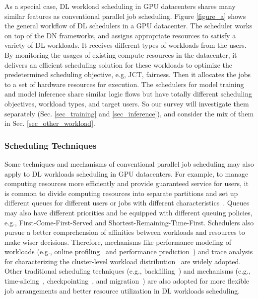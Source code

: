 As a special case, DL workload scheduling in GPU datacenters shares many similar features as conventional parallel job scheduling. Figure \ref{figure_a} shows the general workflow of DL schedulers in a GPU datacenter. The scheduler works on top of the DN frameworks, and assigns appropriate resources to satisfy a variety of DL workloads. It receives different types of workloads from the users. By monitoring the usages of existing compute resources in the datacenter, it delivers an efficient scheduling solution for these workloads to optimize the predetermined scheduling objective, e.g, JCT, fairness. Then it allocates the jobs to a set of hardware resources for execution. The schedulers for model training and model inference share similar logic flows but have totally different scheduling objectives, workload types, and target users. So our survey will investigate them separately (Sec. \ref{sec_training} and \ref{sec_inference}), and consider the mix of them in Sec. \ref{sec_other_workload}.




\subsubsection{Scheduling Techniques}


Some techniques and mechanisms of conventional parallel job scheduling may also apply to DL workloads scheduling in GPU datacenters. For example, to manage computing resources more efficiently and provide guaranteed service for users, it is common to divide computing resources into separate partitions and set up different queues for different users or jobs with different characteristics~\cite{feitelson1997theory, Tiresias, ASTRAEA}. Queues may also have different priorities and be equipped with different queuing policies, e.g., First-Come-First-Served and Shortest-Remaining-Time-First. Schedulers also pursue a better comprehension of affinities between workloads and resources to make wiser decisions. Therefore, mechanisms like performance modeling of workloads (e.g., online profiling~\cite{Chronus} and performance prediction~\cite{Tiresias}) and trace analysis for characterizing the cluster-level workload distribution~\cite{Helios, MLaaS} are widely adopted. Other traditional scheduling techniques (e.g., backfilling~\cite{mu2001backfilling, Tiresias}) and mechanisms (e.g., time-slicing~\cite{Gandiva}, checkpointing~\cite{ASTRAEA}, and migration~\cite{Gandiva, Gandivafair}) are also adopted for more flexible job arrangements and better resource utilization in DL workloads scheduling.















